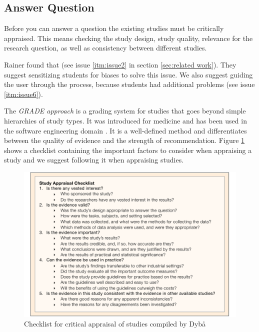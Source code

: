 
\subsection{Answer Question}
\label{subsec:answer question}

Before you can answer a question the existing studies must be critically appraised. This means checking the study design, study quality, relevance for the research question, as well as consistency between different studies. 

Rainer \etal found that  \cite{Rainer2006} (see issue \ref{itm:issue2} in section \ref{sec:related work}). They suggest sensitizing students for biases to solve this issue. We also suggest guiding the user through the process, because students had additional problems (see issue \ref{itm:issue6}). 

The \emph{GRADE approach} \cite{Atkins2004} is a grading system for studies that goes beyond simple hierarchies of study types. It was introduced for medicine and has been used in the software engineering domain \cite{Wohlin2013EvidenceProfile,Dyba2008}. It is a well-defined method and differentiates between the quality of evidence and the strength of recommendation. Figure \ref{fig:critical appraisal} shows a checklist containing the important factors to consider when appraising a study and we suggest following it when appraising studies. 

\begin{figure}
	\centering
	\includegraphics[width=12cm]{figures/study_appraisal.pdf}
\caption{Checklist for critical appraisal of studies compiled by Dyb{\aa} \etal \cite{Dyba2005} }
\label{fig:critical appraisal}
\end{figure}

